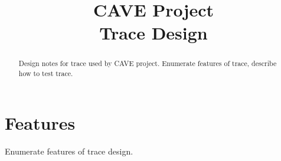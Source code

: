 
\title{CAVE Project \\
Trace Design}





\maketitle

\begin{abstract}

Design notes for trace used by CAVE project.  Enumerate features of trace,
describe how to test trace.

\end{abstract}

\section{Features}

Enumerate features of trace design.

